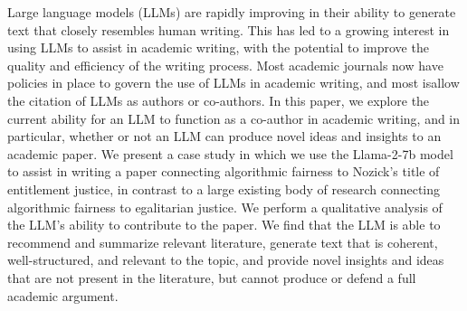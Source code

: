Large language models (LLMs) are rapidly improving in their ability to generate
text that closely resembles human writing. This has led to a growing interest
in using LLMs to assist in academic writing, with the potential to improve the
quality and efficiency of the writing process. Most academic journals now have
policies in place to govern the use of LLMs in academic writing, and most 
isallow the citation of LLMs as authors or co-authors. In this paper, we explore
the current ability for an LLM to function as a co-author in academic writing,
and in particular, whether or not an LLM can produce novel ideas and insights to
an academic paper. We present a case study in which we use the Llama-2-7b model
to assist in writing a paper connecting algorithmic fairness to Nozick's title
of entitlement justice, in contrast to a large existing body of research
connecting algorithmic fairness to egalitarian justice. We perform a qualitative
analysis of the LLM's ability to contribute to the paper. We find that the LLM
is able to recommend and summarize relevant literature, generate text that is
coherent, well-structured, and relevant to the topic, and provide novel insights
and ideas that are not present in the literature, but cannot produce or defend a
full academic argument.